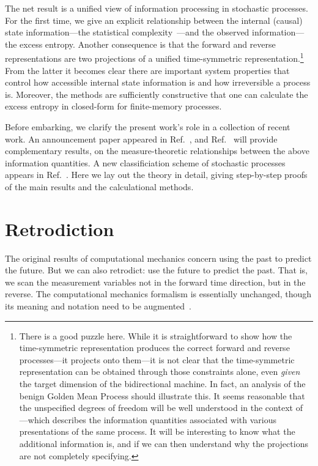 The net result is a unified view of information processing in
stochastic processes. For the first time, we give an explicit
relationship between the internal (causal) state information---the statistical
complexity~\cite{Crut88a}---and the observed information---the excess entropy.
Another consequence is that the forward and reverse representations are two
projections of a unified time-symmetric representation.\footnote{There is a good puzzle here. While it is straightforward to show how the time-symmetric representation produces the correct forward and reverse processes---it projects onto them---it is not clear that the time-symmetric representation can be obtained through those constraints alone, even \emph{given} the target dimension of the bidirectional machine. In fact, an analysis of the benign Golden Mean Process should illustrate this. It seems reasonable that the unspecified degrees of freedom will be well understood in the context of ---which describes the information quantities associated with various presentations of the same process. It will be interesting to know what the additional information is, and if we can then understand why the projections are not completely specifying.} From the latter it
becomes clear there are important system properties that control how accessible
internal state information is and how irreversible a process is. Moreover, the
methods are sufficiently constructive that one can calculate the excess
entropy in closed-form for finite-memory processes.

Before embarking, we clarify the present work's role in a collection of 
recent work. An announcement paper appeared in Ref.~\cite{Crut08a}, and 
Ref.~\cite{Crut08c} will provide complementary results, on the measure-theoretic 
relationships between the above information quantities. A new classificiation
scheme of stochastic processes appears in Ref.~\cite{Crut08d}. Here we lay out
the theory in detail, giving step-by-step proofs of the main results and the
calculational methods. 

\section{Retrodiction}

The original results of computational mechanics concern using the past to
predict the future. But we can also retrodict: use the future to predict
the past. That is, we scan the measurement variables not in the forward time
direction, but in the reverse. The computational mechanics formalism is
essentially unchanged, though its meaning and notation need to be 
augmented~\cite{Crut91b}.

